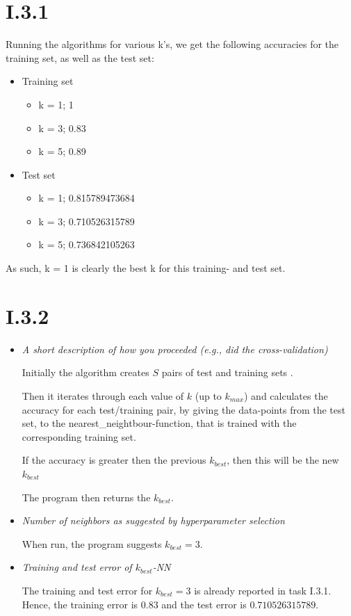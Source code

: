 \documentclass[12pt, a4paper]{article}
\begin{document}
\begin{itemize}
\end{itemize}

\newpage
\section{I.3.1}

Running the algorithms for various k's, we get the following accuracies for the training set, as well as the test set:

\begin{itemize}
	\item Training set
	\begin{itemize}
		\item k = 1; 1
		\item k = 3; 0.83
		\item k = 5; 0.89
	\end{itemize}

	\item Test set
	\begin{itemize}
		\item k = 1; 0.815789473684
		\item k = 3; 0.710526315789
		\item k = 5; 0.736842105263
	\end{itemize}
\end{itemize}

As such, k = 1 is clearly the best k for this training- and test set.

\section{I.3.2}
\begin{itemize}
\item \textit{A short description of how you proceeded (e.g., did the
cross-validation)}

Initially the algorithm creates $S$ pairs of test and training sets .

Then it iterates through each value of $k$ (up to $k_{max}$) and calculates the accuracy for each test/training pair, by giving the data-points from the test set, to the nearest\_neightbour-function, that is trained with the corresponding training set.

If the accuracy is greater then the previous $k_{best}$, then this will be the new $k_{best}$

The program then returns the $k_{best}$.

\item \textit{Number of neighbors as suggested by hyperparameter selection}

When run, the program suggests $k_{best} = 3$.

\item \textit{Training and test error of $k_{best}$-NN}

The training and test error for $k_{best} = 3$ is already reported in task I.3.1. Hence, the training error is $0.83$ and the test error is $0.710526315789$.

\end{itemize}
\end{document}
